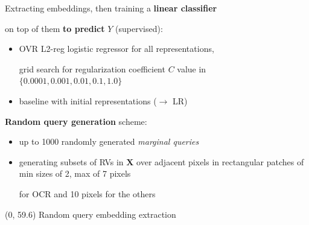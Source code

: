 \documentclass[final]{beamer}
\begin{document}
\begin{frame}{}
\begin{textblock}{25.2}
    Extracting embeddings, then training a \textbf{linear classifier}\par
    on top of them \textbf{to predict} $Y$ (supervised):
    \begin{itemize}
    \item OVR L2-reg logistic regressor for all representations,\par
      grid search for regularization coefficient $C$ value in $\{0.0001, 0.001, 0.01, 0.1, 1.0\}$
      \item  baseline with initial representations ($\rightarrow$ \textsf{LR})
    \end{itemize}\vspace{15pt}

    
    \textbf{Random query generation} scheme:
    \begin{itemize}
    \item up to 1000 randomly generated \emph{marginal queries}
      \item generating subsets of RVs in $\mathbf{X}$ over adjacent
        pixels in rectangular patches of min sizes of 2, max of 7 pixels\par
        for \textsf{OCR} and 10 pixels for the others
    \end{itemize}
  \end{textblock}

  
  \begin{textblock}{80}(0, 59.6)
    Random query embedding extraction
  \end{textblock}
  
  
    

\end{frame}
\end{document}
